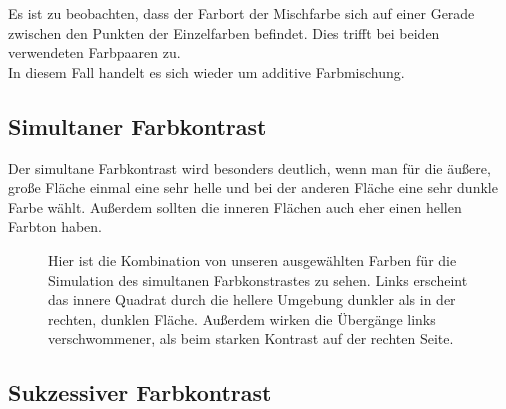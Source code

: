 \documentclass[11pt]{article}
\begin{document}
Es ist zu beobachten, dass der Farbort der Mischfarbe sich auf einer Gerade zwischen den Punkten der Einzelfarben befindet. Dies trifft bei beiden verwendeten Farbpaaren zu. \\

In diesem Fall handelt es sich wieder um additive Farbmischung. 

\subsection{Simultaner Farbkontrast}
Der simultane Farbkontrast wird besonders deutlich, wenn man für die äußere, große Fläche einmal eine sehr helle und bei der anderen Fläche eine sehr dunkle Farbe wählt. Außerdem sollten die inneren Flächen auch eher einen hellen Farbton haben. 

\begin{figure}[H]
\caption{Hier ist die Kombination von unseren ausgewählten Farben für die Simulation des simultanen Farbkonstrastes zu sehen. Links erscheint das innere Quadrat durch die hellere Umgebung dunkler als in der rechten, dunklen Fläche. Außerdem wirken die Übergänge links verschwommener, als beim starken Kontrast auf der rechten Seite.}
\label{meta2}
\end{figure}

\subsection{Sukzessiver Farbkontrast}
\end{document}
